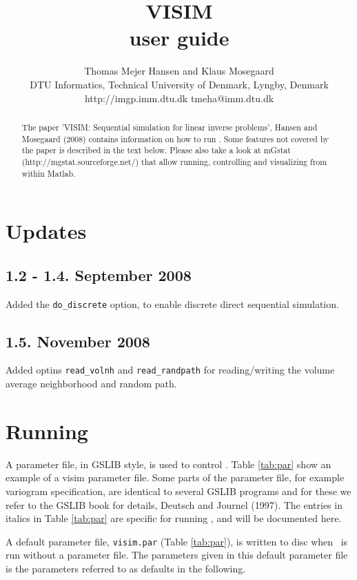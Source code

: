 \documentclass[12t]{article}
\title{VISIM\\user guide}
\author{Thomas Mejer Hansen and Klaus Mosegaard\\
DTU Informatics, Technical University of Denmark, Lyngby, Denmark\\
http://imgp.imm.dtu.dk tmeha@imm.dtu.dk}
\begin{document}
\maketitle

\begin{abstract}
The paper 'VISIM: Sequential simulation for linear inverse problems', Hansen and Mosegaard (2008) contains information on how to run \visimprog. Some features not covered by the paper is described in the text below. Please also take a look at mGstat (http://mgstat.sourceforge.net/) that allow running, controlling and visualizing \visimprog from within Matlab.
\end{abstract}


\section{Updates}
\subsection{1.2 - 1.4. September 2008}
Added the \texttt{do\_discrete} option, to enable discrete direct sequential simulation.

\subsection{1.5. November 2008}
Added optins \texttt{read\_volnh} and \texttt{read\_randpath} for reading/writing the volume average neighborhood and random path.



\section{Running \visimprog}
\label{sec:running}
A parameter file, in GSLIB style, is used to control \visimprog. Table
\ref{tab:par} show an example of a visim parameter file. Some parts of
the parameter file, for example variogram specification, are identical
to several GSLIB programs and for these we refer to the GSLIB book for
details, Deutsch and Journel (1997). 
The entries in italics in Table \ref{tab:par} are specific for running \visimprog, and will be documented here.

A default parameter file, \texttt{visim.par} (Table \ref{tab:par}), is written to disc when
\visimprog~is run without a parameter file. The parameters given in this default parameter file is the parameters referred to as defaults in the following.
\end{document}
